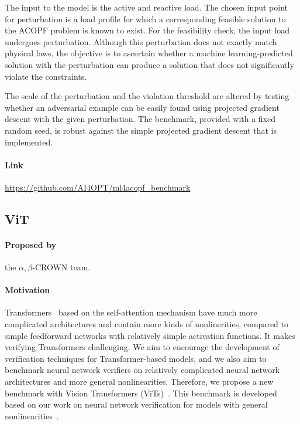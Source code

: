 \documentclass[oneside,11pt,dvipsnames]{book}
\begin{document}
The input to the model is the active and reactive load. The chosen input point for perturbation is a load profile for which a corresponding feasible solution to the ACOPF problem is known to exist. For the feasibility check, the input load undergoes perturbation. Although this perturbation does not exactly match physical laws, the objective is to ascertain whether a machine learning-predicted solution with the perturbation can produce a solution that does not significantly violate the constraints.

The scale of the perturbation and the violation threshold are altered by testing whether an adversarial example can be easily found using projected gradient descent with the given perturbation. The benchmark, provided with a fixed random seed, is robust against the simple projected gradient descent that is implemented.

\paragraph*{Link} \url{https://github.com/AI4OPT/ml4acopf_benchmark}


\subsection{ViT}
\paragraph*{Proposed by} the $\alpha,\!\beta$-CROWN team.
\paragraph*{Motivation}
Transformers~\cite{vaswani2017attention} based on the self-attention mechanism have much more complicated architectures and contain more kinds of nonlinerities, compared to simple feedforward networks with relatively simple activation functions. 
It makes verifying Transformers challenging. We aim to encourage the development of verification techniques for Transformer-based models, and we also aim to benchmark neural network verifiers on relatively complicated neural network architectures and more general nonlinearities. Therefore, we propose a new benchmark with Vision Transformers (ViTs)~\cite{dosovitskiy2020image}. This benchmark is developed based on our work on neural network verification for models with general nonlinearities~\cite{shi2024genbab}.
\end{document}
